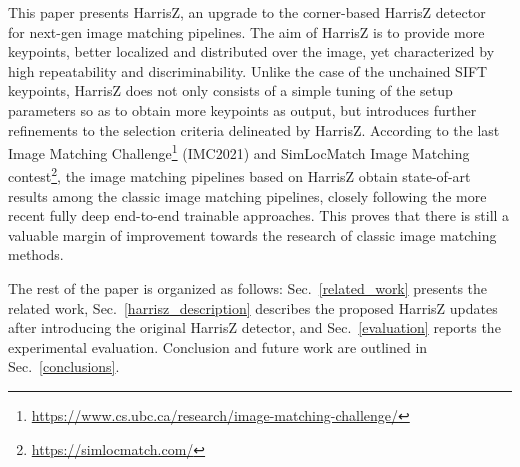 \documentclass[times,twocolumn,final,authoryear]{elsarticle}
\begin{document}
This paper presents HarrisZ, an upgrade to the corner-based HarrisZ detector~\citep{harrisz} for next-gen image matching pipelines. The aim of HarrisZ is to provide more keypoints, better localized and distributed over the image, yet characterized by high repeatability and discriminability. Unlike the case of the unchained SIFT keypoints, HarrisZ does not only consists of a simple tuning of the setup parameters so as to obtain more keypoints as output, but introduces further refinements to the selection criteria delineated by HarrisZ. According to the last Image Matching Challenge\footnote{\scriptsize{\url{https://www.cs.ubc.ca/research/image-matching-challenge/}}} (IMC2021) and SimLocMatch Image Matching contest\footnote{\scriptsize{\url{https://simlocmatch.com/}}}, the image matching pipelines based on HarrisZ obtain state-of-art results among the classic image matching pipelines, closely following the more recent fully deep end-to-end trainable approaches. This proves that there is still a valuable margin of improvement towards the research of classic image matching methods.

The rest of the paper is organized as follows: Sec.~\ref{related_work} presents the related work, Sec.~\ref{harrisz_description} describes the proposed HarrisZ updates after introducing the original HarrisZ detector, and Sec.~\ref{evaluation} reports the experimental evaluation. Conclusion and future work are outlined in Sec.~\ref{conclusions}.
\vspace{-1em}
\end{document}
